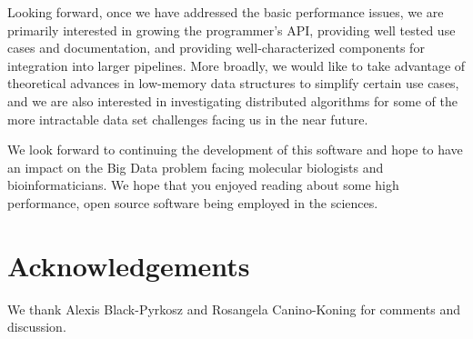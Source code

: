 \documentclass{article}
\begin{document}
Looking forward, once we have addressed the basic performance issues,
we are primarily interested in growing the programmer's API, providing
well tested use cases and documentation, and providing
well-characterized components for integration into larger pipelines.
More broadly, we would like to take advantage of theoretical advances
in low-memory data structures to simplify certain use cases, and we
are also interested in investigating distributed algorithms for some
of the more intractable data set challenges facing us in the near
future.

We look forward to continuing the development of this software and
hope to have an impact on the Big Data problem facing molecular
biologists and bioinformaticians. We hope that you enjoyed reading
about some high performance, open source software being employed in
the sciences.

\section{Acknowledgements}

We thank Alexis Black-Pyrkosz and Rosangela Canino-Koning for comments and
discussion.



\end{document}
